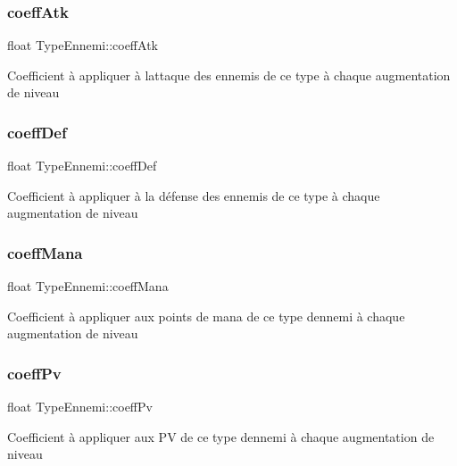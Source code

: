 \subsubsection{\texorpdfstring{coeff\+Atk}{coeffAtk}}
{\footnotesize\ttfamily float Type\+Ennemi\+::coeff\+Atk}

Coefficient à appliquer à l\textquotesingle{}attaque des ennemis de ce type à chaque augmentation de niveau \mbox{\label{structTypeEnnemi_a7621d916e93ef786b6dfcb46dfad61d4}} 
\subsubsection{\texorpdfstring{coeff\+Def}{coeffDef}}
{\footnotesize\ttfamily float Type\+Ennemi\+::coeff\+Def}

Coefficient à appliquer à la défense des ennemis de ce type à chaque augmentation de niveau \mbox{\label{structTypeEnnemi_af7beb579213913c0012b3d0ad670a944}} 
\subsubsection{\texorpdfstring{coeff\+Mana}{coeffMana}}
{\footnotesize\ttfamily float Type\+Ennemi\+::coeff\+Mana}

Coefficient à appliquer aux points de mana de ce type d\textquotesingle{}ennemi à chaque augmentation de niveau \mbox{\label{structTypeEnnemi_a88cb0d5fa7e38e1de0f769eabe1a7594}} 
\subsubsection{\texorpdfstring{coeff\+Pv}{coeffPv}}
{\footnotesize\ttfamily float Type\+Ennemi\+::coeff\+Pv}

Coefficient à appliquer aux PV de ce type d\textquotesingle{}ennemi à chaque augmentation de niveau \mbox{\label{structTypeEnnemi_ab16b72a14f6969108c2bc3a5d59aba26}} 
